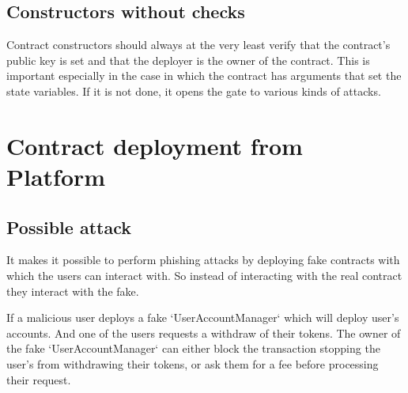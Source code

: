 \subsection{Constructors without checks}
\label{constructor:check}

Contract constructors should always at the very least verify that the contract's public key is set and that the deployer is the owner of the contract. This is important especially in the case in which the contract has arguments that set the state variables. If it is not done, it opens the gate to various kinds of attacks.

\section{Contract deployment from Platform}


\subsection{Possible attack}

It makes it possible to perform phishing attacks by deploying fake contracts with which the users can interact with. So instead of interacting with the real contract they interact with the fake. 

If a malicious user deploys a fake `UserAccountManager` which will deploy user's accounts. And one of the users requests a withdraw of their tokens. The owner of the fake `UserAccountManager` can either block the transaction stopping the user's from withdrawing their tokens, or ask them for a fee before processing their request.


